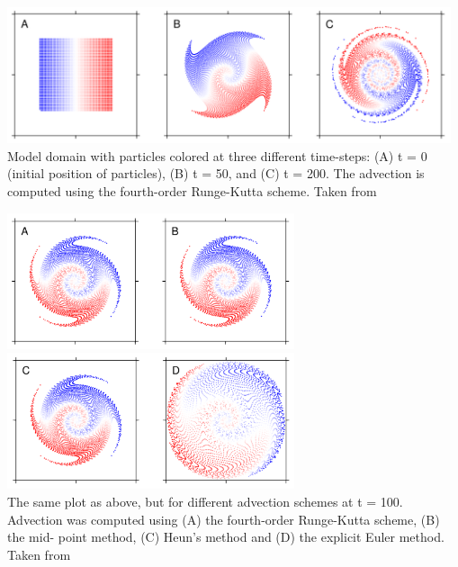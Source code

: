\begin{center}
\includegraphics[height=4cm]{images/rk/maie12a}\\
{\small Model domain with particles colored at three
different time-steps: (A) t = 0 (initial position of particles), (B) t = 50, and (C) t = 200.
The advection is computed using the fourth-order Runge-Kutta scheme. Taken from \cite{maie12}}
\end{center}

\begin{center}
\includegraphics[height=4cm]{images/rk/maie12b}
\includegraphics[height=4cm]{images/rk/maie12c}\\
{\small The same plot as above, but for different advection schemes at t = 100.
Advection was computed using (A) the fourth-order Runge-Kutta scheme, (B) the mid-
point method, (C) Heun’s method and (D) the explicit Euler method. Taken from \cite{maie12}}
\end{center}






